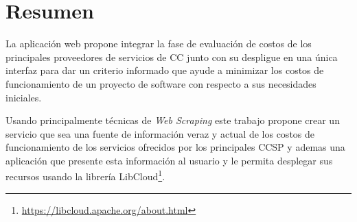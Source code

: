 

\begingroup
\let\clearpage\relax
\let\cleardoublepage\relax
\let\cleardoublepage\relax




\chapter*{Resumen}
La aplicación web \appName propone integrar la fase de evaluación de costos de los principales proveedores de servicios de \acrshort{CC} junto con su despligue en una única interfaz para dar un criterio informado que ayude a minimizar los costos de funcionamiento de un proyecto de software con respecto a sus necesidades iniciales.\bigskip

Usando principalmente técnicas de \emph{Web Scraping} este trabajo propone crear un servicio que sea una fuente de información veraz y actual de los costos de funcionamiento de los servicios ofrecidos por los principales \acrshort{CCSP} y ademas una aplicación que presente esta información al usuario y le permita desplegar sus recursos usando la librería \gls{LibCloud}\footnote{\url{https://libcloud.apache.org/about.html}}.
\endgroup			

\vfill
